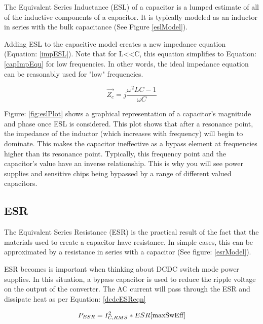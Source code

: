 The Equivalent Series Inductance (ESL) of a capacitor is a lumped estimate of all of the inductive components of a capacitor. It is typically modeled as an inductor in series with the bulk capacitance (See Figure \ref{eslModel}).



Adding ESL to the capacitive model creates a new impedance equation (Equation: \eqref{impESL}). Note that for L\textless \textless C, this equation simplifies to Equation: \eqref{capImpEqu} for low frequencies. In other words, the ideal impedance equation can be reasonably used for "low" frequencies.

\begin{equation}
\label{impESL}
\vec{Z_c} = j\frac{\omega ^2LC - 1}{\omega C}
\end{equation}



Figure: \ref{fig:eslPlot} shows a graphical representation of a capacitor's magnitude and phase once ESL is considered. This plot shows that after a resonance point, the impedance of the inductor (which increases with frequency) will begin to dominate. This makes the capacitor ineffective as a bypass element at frequencies higher than its resonance point. Typically, this frequency point and the capacitor's value have an inverse relationship. This is why you will see power supplies and sensitive chips being bypassed by a range of different valued capacitors. 

\subsection{ESR}
\label{sec:ESR}

The Equivalent Series Resistance (ESR) is the practical result of the fact that the materials used to create a capacitor have resistance. In simple cases, this can be approximated by a resistance in series with a capacitor (See figure: \ref{esrModel}).

ESR becomes is important when thinking about DCDC switch mode power supplies. In this situation, a bypass capacitor is used to reduce the ripple voltage on the output of the converter. The AC current will pass through the ESR and dissipate heat as per Equation: \eqref{dcdcESReqn}

\begin{equation}
\label{dcdcESReqn}
P_{ESR} = I_{C,RMS}^2 * ESR
\cite{maxSwEff}
\end{equation}


